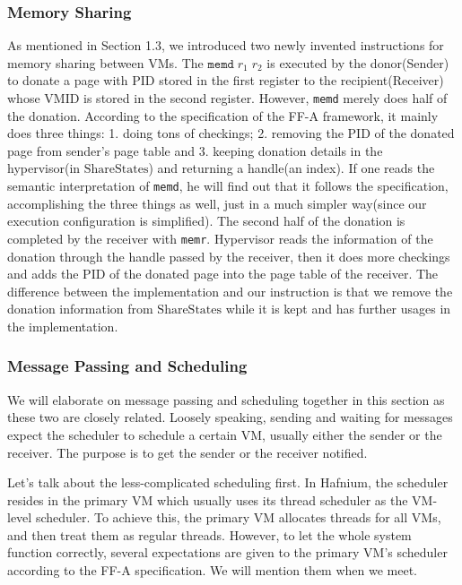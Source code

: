 \documentclass[a4paper]{article}
\newcommand*{\SSS}{\text{ShareStates}}
\newcommand*{\PID}{\text{PID}}
\newcommand*{\VMID}{\text{VMID}}
\newcommand*{\instr}[1]{\texttt{#1}}
\begin{document}
\subsubsection{Memory Sharing}
As mentioned in Section 1.3, we introduced two newly invented instructions for
memory sharing between VMs. The $\instr{memd}\; r_{1}\; r_{2}$ is executed by
the donor(Sender) to donate a page with $\PID$ stored in the first register to
the recipient(Receiver) whose $\VMID$ is stored in the second register. However,
\instr{memd} merely does half of the donation. According to the specification of
the FF-A framework, it mainly does three things: 1. doing tons of checkings; 2.
removing the $\PID$ of the donated page from sender's page table and 3. keeping
donation details in the hypervisor(in $\SSS$) and returning a handle(an index).
If one reads the semantic interpretation of \instr{memd}, he will find out that
it follows the specification, accomplishing the three things as well, just in a
much simpler way(since our execution configuration is simplified). The second
half of the donation is completed by the receiver with \instr{memr}. Hypervisor
reads the information of the donation through the handle passed by the receiver,
then it does more checkings and adds the $\PID$ of the donated page into the
page table of the receiver. The difference between the implementation and our
instruction is that we remove the donation information from $\SSS$ while it is
kept and has further usages in the implementation.

\subsubsection{Message Passing and Scheduling}
We will elaborate on message passing and scheduling together in this section as
these two are closely related. Loosely speaking, sending and waiting for
messages expect the scheduler to schedule a certain VM, usually either the
sender or the receiver. The purpose is to get the sender or the
receiver notified.

Let's talk about the less-complicated scheduling first. In Hafnium, the
scheduler resides in the primary VM which usually uses its thread scheduler as
the VM-level scheduler. To achieve this, the primary VM allocates threads for all
VMs, and then treat them as regular threads. However, to let the whole system
function correctly, several expectations are given to the primary VM's scheduler
according to the FF-A specification. We will mention them when we meet.
\end{document}
